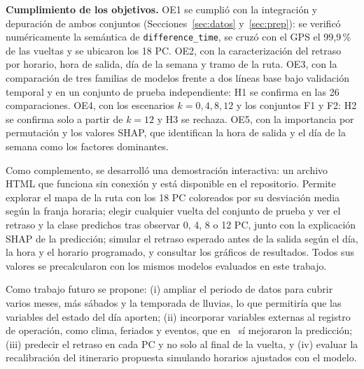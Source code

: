 \documentclass[conference]{IEEEtran}
\begin{document}
\textbf{Cumplimiento de los objetivos.} OE1 se cumplió con la integración y depuración de ambos conjuntos (Secciones~\ref{sec:datos} y~\ref{sec:prep}): se verificó numéricamente la semántica de \texttt{difference\_time}, se cruzó con el GPS el 99,9\,\% de las vueltas y se ubicaron los 18 PC. OE2, con la caracterización del retraso por horario, hora de salida, día de la semana y tramo de la ruta. OE3, con la comparación de tres familias de modelos frente a dos líneas base bajo validación temporal y en un conjunto de prueba independiente: H1 se confirma en las 26 comparaciones. OE4, con los escenarios $k = 0, 4, 8, 12$ y los conjuntos F1 y F2: H2 se confirma solo a partir de $k = 12$ y H3 se rechaza. OE5, con la importancia por permutación y los valores SHAP, que identifican la hora de salida y el día de la semana como los factores dominantes.

Como complemento, se desarrolló una demostración interactiva: un archivo HTML que funciona sin conexión y está disponible en el repositorio. Permite explorar el mapa de la ruta con los 18 PC coloreados por su desviación media según la franja horaria; elegir cualquier vuelta del conjunto de prueba y ver el retraso y la clase predichos tras observar 0, 4, 8 o 12 PC, junto con la explicación SHAP de la predicción; simular el retraso esperado antes de la salida según el día, la hora y el horario programado, y consultar los gráficos de resultados. Todos sus valores se precalcularon con los mismos modelos evaluados en este trabajo.

Como trabajo futuro se propone: (i) ampliar el periodo de datos para cubrir varios meses, más sábados y la temporada de lluvias, lo que permitiría que las variables del estado del día aporten; (ii) incorporar variables externas al registro de operación, como clima, feriados y eventos, que en~\cite{meyer2023} sí mejoraron la predicción; (iii) predecir el retraso en cada PC y no solo al final de la vuelta, y (iv) evaluar la recalibración del itinerario propuesta simulando horarios ajustados con el modelo.
\end{document}
